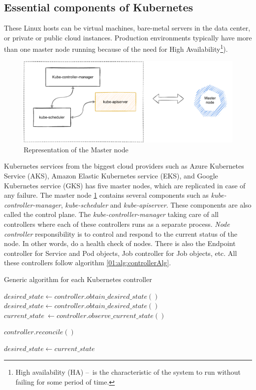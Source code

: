 \subsection{Essential components of Kubernetes}
These Linux hosts can be virtual machines, bare-metal servers in the data center, or private or public cloud instances. Production environments typically have more than one master node running because of the need for High Availability\footnote{High availability (HA) \---\ is the characteristic of the system to run without failing for some period of time.}). 
\begin{figure}[!h]
    \centering
    \includegraphics[scale=0.82]{obrazky-figures/02-preliminaries/01-kubernetes/02-architecture-master-sketch.pdf}
    \caption{Representation of the Master node}
    \label{02:fig:masterNode}
\end{figure}
Kubernetes services from the biggest cloud providers such as Azure Kubernetes Service (AKS), Amazon Elastic Kubernetes service (EKS), and Google Kubernetes service (GKS) has five master nodes, which are replicated in case of any failure. The master node \ref{02:fig:masterNode} contains several components such as \emph{kube-controller-manager}, \emph{kube-scheduler} and \emph{kube-apiserver}. These components are also called the control plane. The \emph{kube-controller-manager} taking care of all controllers where each of these controllers runs as a separate process. \emph{Node controller} responsibility is to control and respond to the current status of the node. In other words, do a health check of nodes. There is also the Endpoint controller for Service and Pod objects, Job controller for Job objects, etc. All these controllers follow algorithm \ref{01:alg:controllerAlg}.
\begin{algorithm}[H]
\label{01:alg:controllerAlg}
\caption{Generic algorithm for each Kubernetes controller}

    \begin{algorithmic}[1]
        \State $desired\_state \gets controller.obtain\_desired\_state()$
            \State $desired\_state \gets controller.obtain\_desired\_state()$
            \State $current\_state\ \gets controller.observe\_current\_state()$
            
                \State $controller.reconcile()$
            \EndIf
    
           \State $desired\_state \gets current\_state$
        \EndWhile
    \end{algorithmic}
\end{algorithm}
